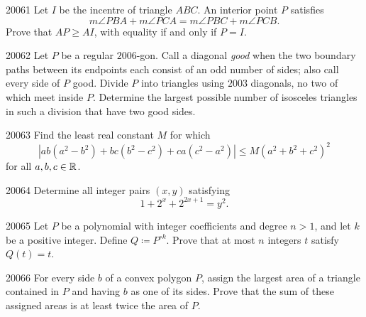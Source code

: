
\begin{problem}{2006}{1}
Let $I$ be the incentre of triangle $ABC$. An interior point $P$ satisfies
\[
    m\angle PBA+m\angle PCA=m\angle PBC+m\angle PCB.
\]
Prove that $AP\geq AI$, with equality if and only if $P=I$.
\end{problem}

\begin{problem}{2006}{2}
Let $P$ be a regular $2006$-gon. Call a diagonal \emph{good} when the two boundary paths between its endpoints each consist of an odd number of sides; also call every side of $P$ good. Divide $P$ into triangles using $2003$ diagonals, no two of which meet inside $P$. Determine the largest possible number of isosceles triangles in such a division that have two good sides.
\end{problem}

\begin{problem}{2006}{3}
Find the least real constant $M$ for which
\[
    \left|ab(a^2-b^2)+bc(b^2-c^2)+ca(c^2-a^2)\right|
    \leq M(a^2+b^2+c^2)^2
\]
for all $a, b, c\in\mathbb{R}$.
\end{problem}

\begin{problem}{2006}{4}
Determine all integer pairs $(x, y)$ satisfying
\[
    1+2^x+2^{2x+1}=y^2.
\]
\end{problem}

\begin{problem}{2006}{5}
Let $P$ be a polynomial with integer coefficients and degree $n>1$, and let $k$ be a positive integer. Define $Q\coloneqq P^{\circ k}$. Prove that at most $n$ integers $t$ satisfy $Q(t)=t$.
\end{problem}

\begin{problem}{2006}{6}
For every side $b$ of a convex polygon $P$, assign the largest area of a triangle contained in $P$ and having $b$ as one of its sides. Prove that the sum of these assigned areas is at least twice the area of $P$.
\end{problem}
